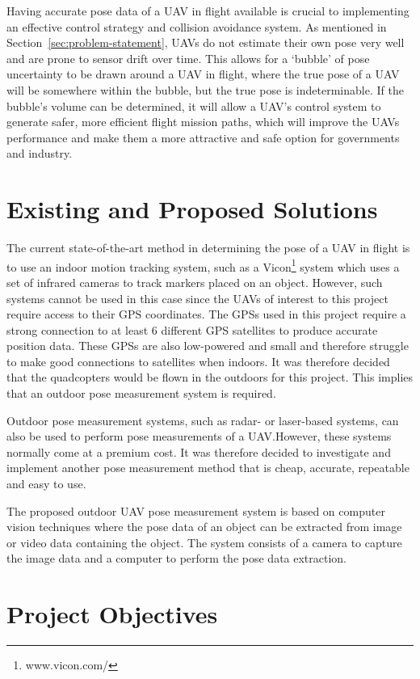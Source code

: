 Having accurate pose data of a UAV in flight available is crucial to implementing an effective control strategy and collision avoidance system. As mentioned in Section~\ref{sec:problem-statement}, UAVs do not estimate their own pose very well and are prone to sensor drift over time. This allows for a `bubble' of pose uncertainty to be drawn around a UAV in flight, where the true pose of a UAV will be somewhere within the bubble, but the true pose is indeterminable. If the bubble's volume can be determined, it will allow a UAV's control system to generate safer, more efficient flight mission paths, which will improve the UAVs performance and make them a more attractive and safe option for governments and industry. 

\section{Existing and Proposed Solutions}

The current state-of-the-art method in determining the pose of a UAV in flight is to use an indoor motion tracking system, such as a Vicon\footnote{www.vicon.com/} system which uses a set of infrared cameras to track markers placed on an object. However, such systems cannot be used in this case since the UAVs of interest to this project require access to their GPS coordinates. The GPSs used in this project require a strong connection to at least 6 different GPS satellites to produce accurate position data. These GPSs are also low-powered and small and therefore struggle to make good connections to satellites when indoors. It was therefore decided that the quadcopters would be flown in the outdoors for this project. This implies that an outdoor pose measurement system is required. 

Outdoor pose measurement systems, such as radar- or laser-based systems, can also be used to perform pose measurements of a UAV.\@ However, these systems normally come at a premium cost. It was therefore decided to investigate and implement another pose measurement method that is cheap, accurate, repeatable and easy to use. 

The proposed outdoor UAV pose measurement system is based on computer vision techniques where the pose data of an object can be extracted from image or video data containing the object. The system consists of a camera to capture the image data and a computer to perform the pose data extraction. 

\section{Project Objectives}

